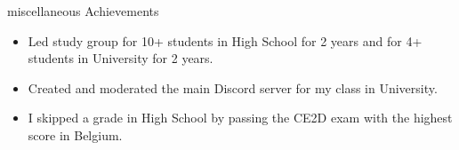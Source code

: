 \documentclass{resume} %
\begin{document}
\begin{rSection}{miscellaneous Achievements}
    \begin{itemize}
        \itemsep -3pt {}
        \item 	Led study group for 10+ students in High School for 2 years and for 4+ students in University for 2 years.
        \item   Created and moderated the main Discord server for my class in University. 
        \item	I skipped a grade in High School by passing the CE2D exam with the highest score in Belgium.
    \end{itemize}
\end{rSection}
\end{document}
